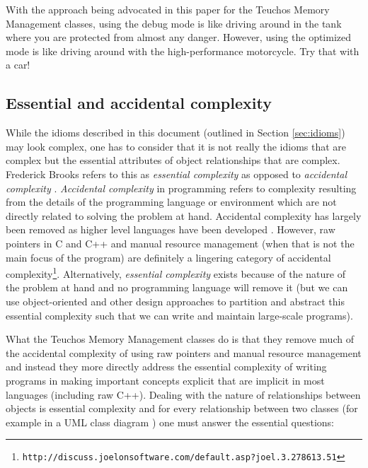 \documentclass[pdf,ps2pdf,11pt]{SANDreport}
\begin{document}
With the approach being advocated in this paper for the Teuchos Memory
Management classes, using the debug mode is like driving around in the
tank where you are protected from almost any danger.  However, using
the optimized mode is like driving around with the high-performance
motorcycle.  Try that with a car!


%
{}\subsection{Essential and accidental complexity}
%

While the idioms described in this document (outlined in Section
{}\ref{sec:idioms}) may look complex, one has to consider that it is
not really the idioms that are complex but the essential attributes of
object relationships that are complex.  Frederick Brooks refers to
this as {}\textit{essential complexity} as opposed to
{}\textit{accidental complexity} {}\cite{MythicalManMonth95}.
{}\textit{Accidental complexity} in programming refers to complexity
resulting from the details of the programming language or environment
which are not directly related to solving the problem at hand.
Accidental complexity has largely been removed as higher level
languages have been developed {}\cite[Chapter 16]{MythicalManMonth95}.
However, raw pointers in C and C++ and manual resource management
(when that is not the main focus of the program) are definitely a
lingering category of accidental complexity\footnote{
{}\texttt{http://discuss.joelonsoftware.com/default.asp?joel.3.278613.51}}.
Alternatively, {}\textit{essential complexity} exists because of the
nature of the problem at hand and no programming language will remove
it (but we can use object-oriented and other design approaches to
partition and abstract this essential complexity such that we can
write and maintain large-scale programs).

What the Teuchos Memory Management classes do is that they remove much
of the accidental complexity of using raw pointers and manual resource
management and instead they more directly address the essential
complexity of writing programs in making important concepts explicit
that are implicit in most languages (including raw C++).  Dealing with
the nature of relationships between objects is essential complexity
and for every relationship between two classes (for example in a UML
class diagram {}\cite{UMLDistilledThirdEdition04}) one must answer the
essential questions:
\end{document}

